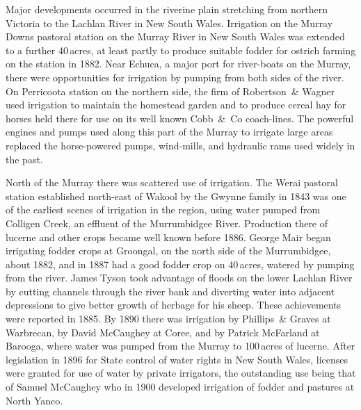 Major developments occurred in the riverine plain stretching from
northern Victoria to the Lachlan River  in New
South Wales.  Irrigation on the Murray Downs pastoral station
 on the Murray River 
in New South Wales was extended to a further 40\,acres, at least
partly to produce suitable fodder for ostrich farming on the station
in 1882. Near Echuca,  a major port for
river-boats on the Murray, there were
opportunities for irrigation by pumping from both sides of the river.
On Perricoota station  on the northern side,
the firm of Robertson~\& Wagner used irrigation to maintain the
homestead garden and to produce cereal hay for horses
held there for use on its well known Cobb~\&~Co 
coach-lines. The powerful engines and pumps used along this part of
the Murray to irrigate large areas replaced the horse-powered
pumps,
 wind-mills, and hydraulic rams used
widely in the past.

North of the Murray there was scattered use of irrigation.  The Werai
pastoral station  established north-east of
Wakool  by the Gwynne family in 1843 was one of the
earliest scenes of irrigation in the region, using water pumped from
Colligen Creek,  an effluent of the Murrumbidgee
River.   Production there of lucerne
 and other crops became well known before 1886.  George
Mair  began irrigating fodder crops at
Groongal,  on the north side of the Murrumbidgee,
about 1882, and in 1887 had a good fodder crop on 40\,acres, watered
by pumping from the river. James Tyson took advantage
of floods on the lower Lachlan
River by cutting
channels through the river bank
and diverting water into adjacent depressions to give better growth of
herbage for his sheep. These achievements were reported
in 1885.  By 1890 there was irrigation by Phillips~\& Graves at
Warbrecan,  by David McCaughey
  at Coree,  and by Patrick
McFarland   at Barooga, 
where water was pumped from the Murray to 100\,acres of
lucerne.  After legislation in 1896 for State control of
water rights in New South Wales, licenses were granted for use of
water by private irrigators, the outstanding use being that of Samuel
McCaughey  who in 1900 developed irrigation of
fodder and pastures at North
Yanco.

